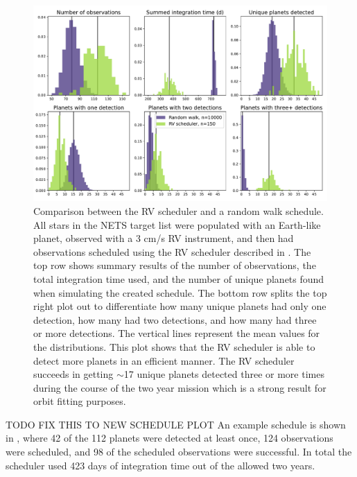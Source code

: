 \begin{figure}
  \begin{center}
    \includegraphics[width=1\textwidth]{ch4/figures/final_results.pdf}
  \end{center}
  \caption{Comparison between the RV scheduler and a random walk schedule.
  All stars in the NETS target list were populated with an Earth-like planet,
  observed with a 3 cm/s RV instrument, and then had observations scheduled
  using the RV scheduler described in . The top row shows
  summary results of the number of observations, the total integration time
used, and the number of unique planets found when simulating the created
schedule. The bottom row splits the top right plot out to differentiate how
many unique planets had only one detection, how many had two detections, and
how many had three or more detections. The vertical lines represent the mean values
for the distributions. This plot shows that the RV scheduler is able to detect
more planets in an efficient manner. The RV scheduler succeeds in getting $\sim$17
unique planets detected three or more times during the course of the two year
mission which is a strong result for orbit fitting purposes.}
  \label{fig:randomwalkhist}
\end{figure}

TODO FIX THIS TO NEW SCHEDULE PLOT
An example schedule is shown in , where 42 of the 112
planets were detected at least once, 124 observations were scheduled, and 98 of
the scheduled observations were successful. In total the scheduler used 423
days of integration time out of the allowed two years. 

